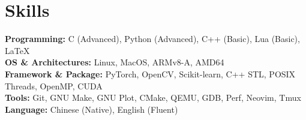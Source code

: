 \documentclass[a4paper,12pt]{article}
\begin{document}
\section{Skills}

\fontsize{10pt}{14pt}\selectfont
\noindent \textbf{Programming:} C (Advanced), Python (Advanced), C++ (Basic), Lua (Basic), \LaTeX \hspace{0.5cm} \\ [0.08cm]
\textbf{OS \& Architectures:} Linux, MacOS, ARMv8-A, AMD64  \\ [0.08cm]
\textbf{Framework \& Package:} PyTorch, OpenCV, Scikit-learn, C++ STL, POSIX Threads, OpenMP, CUDA \\ [0.08cm]
\textbf{Tools:} Git, GNU Make, GNU Plot, CMake, QEMU, GDB, Perf, Neovim, Tmux \\ [0.08cm]
\textbf{Language:} Chinese (Native), English (Fluent)

\vfill
{}
\end{document}
